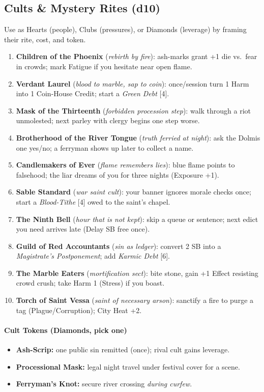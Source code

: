 \subsection*{Cults \& Mystery Rites (d10)}
\label{sec:ecktoria-cults}
Use as Hearts (people), Clubs (pressures), or Diamonds (leverage) by framing their rite, cost, and token.
\begin{enumerate}
  \item \textbf{Children of the Phoenix} (\emph{rebirth by fire}): ash-marks grant +1 die vs.\ fear in crowds; mark Fatigue if you hesitate near open flame.
  \item \textbf{Verdant Laurel} (\emph{blood to marble, sap to coin}): once/session turn 1 Harm into 1 Coin-House Credit; start a \emph{Green Debt} [4].
  \item \textbf{Mask of the Thirteenth} (\emph{forbidden procession step}): walk through a riot unmolested; next parley with clergy begins one step worse.
  \item \textbf{Brotherhood of the River Tongue} (\emph{truth ferried at night}): ask the Dolmis one yes/no; a ferryman shows up later to collect a name.
  \item \textbf{Candlemakers of Ever} (\emph{flame remembers lies}): blue flame points to falsehood; the liar dreams of you for three nights (Exposure +1).
  \item \textbf{Sable Standard} (\emph{war saint cult}): your banner ignores morale checks once; start a \emph{Blood-Tithe} [4] owed to the saint’s chapel.
  \item \textbf{The Ninth Bell} (\emph{hour that is not kept}): skip a queue or sentence; next edict you need arrives late (Delay SB free once).
  \item \textbf{Guild of Red Accountants} (\emph{sin as ledger}): convert 2 SB into a \emph{Magistrate's Postponement}; add \emph{Karmic Debt} [6].
  \item \textbf{The Marble Eaters} (\emph{mortification sect}): bite stone, gain +1 Effect resisting crowd crush; take Harm 1 (Stress) if you boast.
  \item \textbf{Torch of Saint Vessa} (\emph{saint of necessary arson}): sanctify a fire to purge a tag (Plague/Corruption); City Heat +2.
\end{enumerate}

\paragraph{Cult Tokens (Diamonds, pick one)}
\begin{itemize}
  \item \textbf{Ash-Scrip:} one public sin remitted (once); rival cult gains leverage.
  \item \textbf{Processional Mask:} legal night travel under festival cover for a scene.
  \item \textbf{Ferryman’s Knot:} secure river crossing \emph{during curfew}.
\end{itemize}

